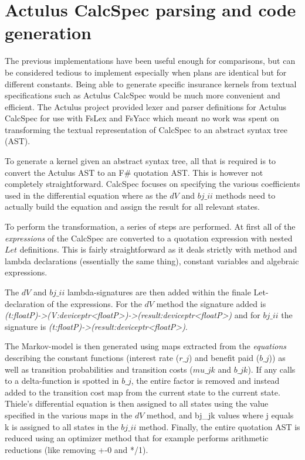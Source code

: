 \section{Actulus CalcSpec parsing and code generation}
The previous implementations have been useful enough for comparisons, but can be considered tedious to implement especially when plans are identical but for different constants.
Being able to generate specific insurance kernels from textual specifications such as Actulus CalcSpec would be much more convenient and efficient.
The Actulus project provided lexer and parser definitions for Actulus CalcSpec for use with FsLex and FsYacc\cite{fslexfsyacc} which meant no work was spent on transforming the textual representation of CalcSpec to an abstract syntax tree (AST).

To generate a kernel given an abstract syntax tree, all that is required is to convert the Actulus AST to an F\# quotation AST.
This is however not completely straightforward.
CalcSpec focuses on specifying the various coefficients used in the differential equation where as the $dV$ and $bj\_ii$ methods need to actually build the equation and assign the result for all relevant states.

To perform the transformation, a series of steps are performed.
At first all of the \emph{expressions} of the CalcSpec are converted to a quotation expression with nested $Let$ definitions.
This is fairly straightforward as it deals strictly with method and lambda declarations (essentially the same thing), constant variables and algebraic expressions.


The $dV$ and $bj\_ii$ lambda-signatures are then added within the finale Let-declaration of the expressions.
For the $dV$ method the signature added is \textit{(t:floatP)-\textgreater{}(V:deviceptr\textless{}floatP\textgreater{})-\textgreater{}(result:deviceptr\textless{}floatP\textgreater{})} and for $bj\_ii$ the signature is \textit{(t:floatP)-\textgreater{}(result:deviceptr\textless{}floatP\textgreater{})}.

The Markov-model is then generated using maps extracted from the \emph{equations} describing the constant functions (interest rate ($r\_j$) and benefit paid ($b\_j$)) as well as transition probabilities and transition costs ($mu\_jk$ and $b\_jk$).
If any calls to a delta-function is spotted in $b\_j$, the entire factor is removed and instead added to the transition cost map from the current state to the current state.
Thiele's differential equation is then assigned to all states using the value specified in the various maps in the $dV$ method, and bj\_jk values where j equals k is assigned to all states in the $bj\_ii$ method.
Finally, the entire quotation AST is reduced using an optimizer method that for example performs arithmetic reductions (like removing +-0 and */1).

